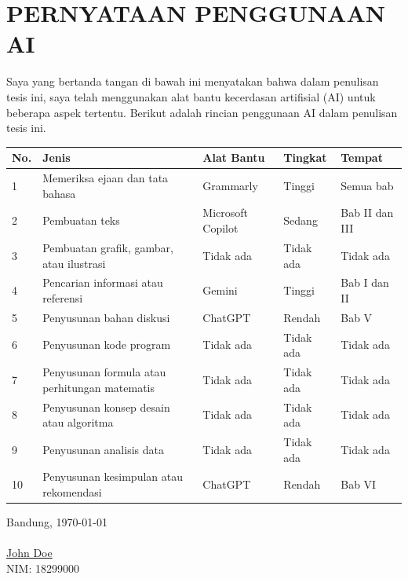 \chapter*{PERNYATAAN PENGGUNAAN AI}
Saya yang bertanda tangan di bawah ini menyatakan bahwa dalam penulisan tesis ini, saya telah menggunakan alat bantu kecerdasan artifisial (AI) untuk beberapa aspek tertentu. Berikut adalah rincian penggunaan AI dalam penulisan tesis ini.
\begin{table}[h]
\begin{tabular}{|p{0.5cm}| p{4cm} | p{2.5cm} | p{2.5cm} | p{3cm} @{}| }
\hline
\textbf{No.} & \textbf{Jenis} & \textbf{Alat Bantu} & \textbf{Tingkat} & \textbf{Tempat}\\
\hline
1 & Memeriksa ejaan dan tata bahasa & Grammarly & Tinggi & Semua bab \\
\hline
2 & Pembuatan teks & Microsoft Copilot & Sedang & Bab II dan III \\
\hline
3 & Pembuatan grafik, gambar, atau ilustrasi & Tidak ada & Tidak ada & Tidak ada \\
\hline
4 & Pencarian informasi atau referensi & Gemini & Tinggi & Bab I dan II \\
\hline
5 & Penyusunan bahan diskusi & ChatGPT & Rendah & Bab V \\
\hline
6 & Penyusunan kode program & Tidak ada & Tidak ada & Tidak ada \\
\hline
7 & Penyusunan formula atau perhitungan matematis & Tidak ada & Tidak ada & Tidak ada \\
\hline
8 & Penyusunan konsep desain atau algoritma & Tidak ada & Tidak ada & Tidak ada \\
\hline
9 & Penyusunan analisis data & Tidak ada & Tidak ada & Tidak ada \\
\hline
10 & Penyusunan kesimpulan atau rekomendasi & ChatGPT & Rendah & Bab VI \\
\hline
\end{tabular}
\end{table}


Bandung, \today\\
\\[2cm]

\underline{John Doe} \\
NIM: 18299000